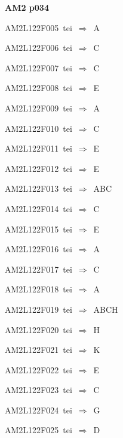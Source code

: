 \par\vfill\eject
{\bf\hfill AM2 p034\hfill\hbox{}}\par\bigskip
{\sixrm AM2L122F005\ {\sixit tei}\ }$\Rightarrow$\ A\par\smallskip
{\sixrm AM2L122F006\ {\sixit tei}\ }$\Rightarrow$\ C\par\smallskip
{\sixrm AM2L122F007\ {\sixit tei}\ }$\Rightarrow$\ C\par\smallskip
{\sixrm AM2L122F008\ {\sixit tei}\ }$\Rightarrow$\ E\par\smallskip
{\sixrm AM2L122F009\ {\sixit tei}\ }$\Rightarrow$\ A\par\smallskip
{\sixrm AM2L122F010\ {\sixit tei}\ }$\Rightarrow$\ C\par\smallskip
{\sixrm AM2L122F011\ {\sixit tei}\ }$\Rightarrow$\ E\par\smallskip
{\sixrm AM2L122F012\ {\sixit tei}\ }$\Rightarrow$\ E\par\smallskip
{\sixrm AM2L122F013\ {\sixit tei}\ }$\Rightarrow$\ ABC\par\smallskip
{\sixrm AM2L122F014\ {\sixit tei}\ }$\Rightarrow$\ C\par\smallskip
{\sixrm AM2L122F015\ {\sixit tei}\ }$\Rightarrow$\ E\par\smallskip
{\sixrm AM2L122F016\ {\sixit tei}\ }$\Rightarrow$\ A\par\smallskip
{\sixrm AM2L122F017\ {\sixit tei}\ }$\Rightarrow$\ C\par\smallskip
{\sixrm AM2L122F018\ {\sixit tei}\ }$\Rightarrow$\ A\par\smallskip
{\sixrm AM2L122F019\ {\sixit tei}\ }$\Rightarrow$\ ABCH\par\smallskip
{\sixrm AM2L122F020\ {\sixit tei}\ }$\Rightarrow$\ H\par\smallskip
{\sixrm AM2L122F021\ {\sixit tei}\ }$\Rightarrow$\ K\par\smallskip
{\sixrm AM2L122F022\ {\sixit tei}\ }$\Rightarrow$\ E\par\smallskip
{\sixrm AM2L122F023\ {\sixit tei}\ }$\Rightarrow$\ C\par\smallskip
{\sixrm AM2L122F024\ {\sixit tei}\ }$\Rightarrow$\ G\par\smallskip
{\sixrm AM2L122F025\ {\sixit tei}\ }$\Rightarrow$\ D\par\smallskip

